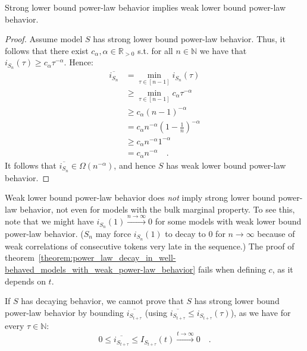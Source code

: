 \documentclass[../../main.tex]{subfiles}
\begin{document}
\pagebreak
    \begin{proposition}
        Strong lower bound power-law behavior implies weak lower bound power-law behavior.
    \end{proposition}
    \vspace{-2.5em}
    \begin{proof}
        Assume model $S$ has strong lower bound power-law behavior. Thus, it follows that there exist $c_\alpha, \alpha \in \mathbb{R}_{>0}$ s.t. for all $n \in \mathbb{N}$ we have that $i_{S_n}(\tau) \geq c_\alpha \tau^{-\alpha}$. Hence:
        \begin{align*}
            \overline{i_{S_n}} &= \min_{\tau \in [n - 1]} i_{S_n}(\tau) \\
            &\geq \min_{\tau \in [n - 1]} c_\alpha \tau^{-\alpha} \\
            &\geq c_\alpha (n - 1)^{-\alpha} \\
            &= c_\alpha n^{-\alpha} (1 - \frac{1}{n})^{-\alpha} \\
            &\geq c_\alpha n^{-\alpha} 1^{-\alpha} \\
            &= c_\alpha n^{-\alpha} \quad .
        \end{align*}
        It follows that $\overline{i_{S_n}} \in \Omega(n^{-\alpha})$, and hence $S$ has weak lower bound power-law behavior.
    \end{proof}

    \begin{remark}
        Weak lower bound power-law behavior does \emph{not} imply strong lower bound power-law behavior, not even for models with the bulk marginal property. To see this, note that we might have  $i_{S_n}(1) \xrightarrow{n \to \infty} 0$ for some models with weak lower bound power-law behavior. ($S_n$ may force $i_{S_n}(1)$ to decay to $0$ for $n \to \infty$ because of weak correlations of consecutive tokens very late in the sequence.) The proof of theorem~\ref{theorem:power_law_decay_in_well-behaved_models_with_weak_power-law_behavior} fails when defining $c$, as it depends on $t$.
    \end{remark}

    \begin{remark}
        If $S$ has decaying behavior, we cannot prove that $S$ has strong lower bound power-law behavior by bounding $\overline{i_{S_{t + \tau}}}$ (using $\overline{i_{S_{t + \tau}}} \leq i_{S_{t + \tau}}(\tau)$), as we have for every $\tau \in \mathbb{N}$:
        \[
            0 \leq \overline{i_{S_{t + \tau}}} \leq I_{S_{t + \tau}}(t) \xrightarrow{t \to \infty} 0 \quad .
        \]
    \end{remark}
\end{document}
